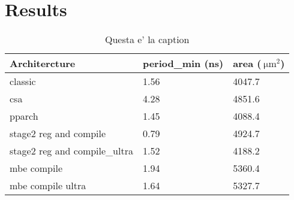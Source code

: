 \section{Results}

\begin{table}[h]
\begin{center}
\begin{tabular}{|l|l|l|}
\hline
Architercture & period\_min (ns) & area ($\SI{}{\micro\meter}^2$)\\
\hline
classic & 1.56 & 4047.7\\
\hline
csa & 4.28 & 4851.6\\
\hline
pparch & 1.45 & 4088.4\\
\hline
stage2 reg and compile & 0.79 & 4924.7\\
\hline
stage2 reg and compile\_ultra & 1.52 & 4188.2\\
\hline
mbe compile & 1.94 & 5360.4\\
\hline
mbe compile ultra & 1.64 & 5327.7\\
\hline

\end{tabular}
\end{center}
\caption{Questa e' la caption}
\label{tab:tab_label}
\end{table}
